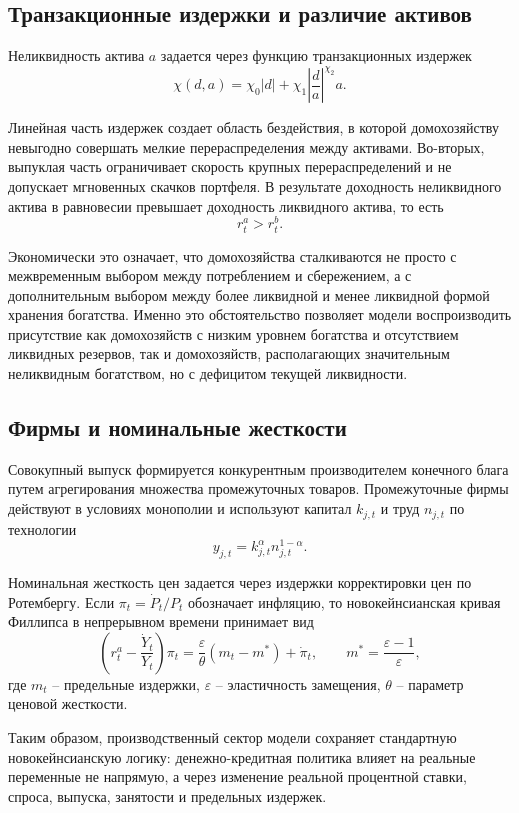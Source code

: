 \documentclass[12pt,a4paper]{article}
\begin{document}
\subsection{Транзакционные издержки и различие активов}

Неликвидность актива $a$ задается через функцию транзакционных издержек
\[
\chi(d,a)=\chi_0 |d| + \chi_1 \left|\frac{d}{a}\right|^{\chi_2} a.
\]

Линейная часть издержек создает область бездействия, в которой домохозяйству невыгодно совершать мелкие перераспределения между активами. Во-вторых, выпуклая часть ограничивает скорость крупных перераспределений и не допускает мгновенных скачков портфеля. В результате доходность неликвидного актива в равновесии превышает доходность ликвидного актива, то есть
\[
r_t^a > r_t^b.
\]

Экономически это означает, что домохозяйства сталкиваются не просто с межвременным выбором между потреблением и сбережением, а с дополнительным выбором между более ликвидной и менее ликвидной формой хранения богатства. Именно это обстоятельство позволяет модели воспроизводить присутствие как домохозяйств с низким уровнем богатства и отсутствием ликвидных резервов, так и домохозяйств, располагающих значительным неликвидным богатством, но с дефицитом текущей ликвидности.

\subsection{Фирмы и номинальные жесткости}

Совокупный выпуск формируется конкурентным производителем конечного блага путем агрегирования множества промежуточных товаров. Промежуточные фирмы действуют в условиях монополии и используют капитал $k_{j,t}$ и труд $n_{j,t}$ по технологии
\[
y_{j,t}=k_{j,t}^{\alpha} n_{j,t}^{1-\alpha}.
\]

Номинальная жесткость цен задается через издержки корректировки цен по Ротембергу. Если $\pi_t=\dot P_t/P_t$ обозначает инфляцию, то новокейнсианская кривая Филлипса в непрерывном времени принимает вид
\[
\left(r_t^a-\frac{\dot Y_t}{Y_t}\right)\pi_t
=
\frac{\varepsilon}{\theta}(m_t-m^*)+\dot \pi_t,
\qquad
m^*=\frac{\varepsilon-1}{\varepsilon},
\]
где $m_t$ -- предельные издержки, $\varepsilon$ -- эластичность замещения, $\theta$ -- параметр ценовой жесткости.

Таким образом, производственный сектор модели сохраняет стандартную новокейнсианскую логику: денежно-кредитная политика влияет на реальные переменные не напрямую, а через изменение реальной процентной ставки, спроса, выпуска, занятости и предельных издержек.
\end{document}
